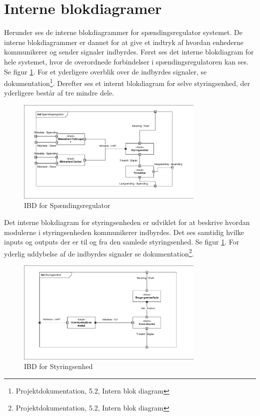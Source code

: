 

\section{Interne blokdiagramer}

Herunder ses de interne blokdiagrammer for spændingsregulator systemet. De interne blokdiagrammer er dannet for at give et indtryk af hvordan enhederne kommunikerer og sender signaler indbyrdes. Først ses det interne blokdiagram for hele systemet, hvor de overordnede forbindelser i spændingsregulatoren kan ses. Se figur \ref{fig:IBDSp}. For et yderligere overblik over de indbyrdes signaler, se dokumentation\footnote{Projektdokumentation, 5.2, Intern blok diagram}.  Derefter ses et internt blokdiagram for selve styringsenhed, der yderligere består af tre mindre dele. 

\begin{figure}[htbp] %
	\centering
	\includegraphics[width=0.8\textwidth]{figure/IBDSpaendingsregulator.pdf}
	\caption{IBD for Spændingsregulator}
	\label{fig:IBDSp}
\end{figure}

Det interne blokdiagram for styringsenheden er udviklet for at beskrive hvordan modulerne i styringsenheden kommunikerer indbyrdes. Det ses samtidig hvilke inputs og outputs der er til og fra den samlede styringsenhed. Se figur \ref{fig:IBDSp}. For yderlig uddybelse af de indbyrdes signaler se dokumentation\footnote{Projektdokumentation, 5.2, Intern blok diagram}.


\begin{figure}[htbp] %
	\centering
	\includegraphics[width=0.8\textwidth]{figure/IBDStyringsenhed.pdf}
	\caption{IBD for Styringsenhed}
	\label{fig:IBDSt}
\end{figure}




